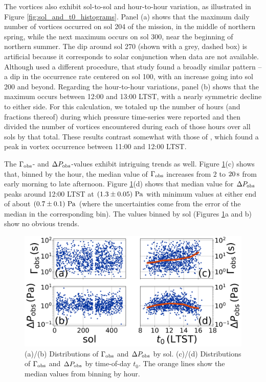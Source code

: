 \documentclass[linenumbers,trackchanges]{aastex63}
\begin{document}
The vortices also exhibit sol-to-sol and hour-to-hour variation, as illustrated in Figure \ref{fig:sol_and_t0_histograms}. Panel (a) shows that the maximum daily number of vortices occurred on sol 204 of the mission, in the middle of northern spring, while the next maximum occurs on sol 300, near the beginning of northern summer. The dip around sol 270 (shown with a grey, dashed box) is artificial because it corresponds to solar conjunction when data are not available. Although \citet{2021JGRE..12606511S} used a different procedure, that study found a broadly similar pattern -- a dip in the occurrence rate centered on sol 100, with an increase going into sol 200 and beyond. Regarding the hour-to-hour variations, panel (b) shows that the maximum occurs between 12:00 and 13:00 LTST, with a nearly symmetric decline to either side. For this calculation, we totaled up the number of hours (and fractions thereof) during which pressure time-series were reported and then divided the number of vortices encountered during each of those hours over all sols by that total. These results contrast somewhat with those of \citet{2021JGRE..12606511S}, which found a peak in vortex occurrence between 11:00 and 12:00 LTST. 

The $\Gamma_{\rm obs}$- and $\Delta P_{\rm obs}$-values exhibit intriguing trends as well. Figure \ref{fig:Gammaobs_DeltaPobs_vs_TOD_and_sol}(c) shows that, binned by the hour, the median value of $\Gamma_{\rm obs}$ increases from $2$ to $20\,{\rm s}$ from early morning to late afternoon. Figure \ref{fig:Gammaobs_DeltaPobs_vs_TOD_and_sol}(d) shows that median value for $\Delta P_{\rm obs}$ peaks around 12:00 LTST at $\left( 1.3\pm0.05 \right)\,{\rm Pa}$ with minimum values at either end of about $\left( 0.7\pm 0.1 \right)\,{\rm Pa}$ (where the uncertainties come from the error of the median in the corresponding bin). The values binned by sol (Figures \ref{fig:Gammaobs_DeltaPobs_vs_TOD_and_sol}a and b) show no obvious trends. 

\begin{figure}
    \centering
    \includegraphics[width=\textwidth]{figures/Gammaobs_DeltaPobs_vs_TOD_and_sol.png}
    \caption{(a)/(b) Distributions of $\Gamma_{\rm obs}$ and $\Delta P_{\rm obs}$ by sol. (c)/(d) Distributions of $\Gamma_{\rm obs}$ and $\Delta P_{\rm obs}$ by time-of-day $t_0$. The orange lines show the median values from binning by hour.}
    \label{fig:Gammaobs_DeltaPobs_vs_TOD_and_sol}
\end{figure}
\end{document}
